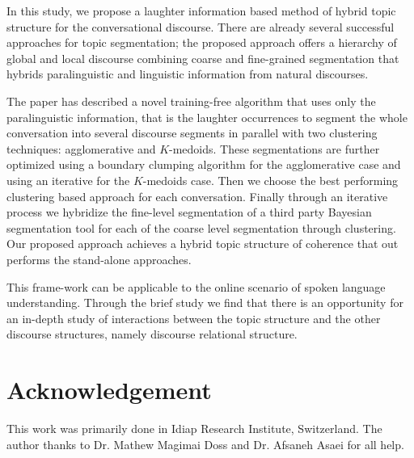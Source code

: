 \documentclass{article}
\begin{document}
In this study, we propose a laughter information based method of hybrid topic structure for the conversational discourse. There are already several successful approaches for topic segmentation; the proposed approach offers a hierarchy of global and local discourse combining coarse and fine-grained segmentation that hybrids paralinguistic and linguistic information from natural discourses. 

The paper has described a novel training-free algorithm that uses only the paralinguistic information, that is the laughter occurrences to segment the whole conversation into several discourse segments in parallel with two clustering techniques: agglomerative and $K$-medoids. These segmentations are further optimized using a boundary clumping algorithm for the agglomerative case and using an iterative for the $K$-medoids case. Then we choose the best performing clustering based approach for each conversation. Finally through an iterative process we hybridize the fine-level segmentation of a third party Bayesian segmentation tool for each of the coarse level segmentation through clustering. Our proposed approach achieves a hybrid topic structure of coherence that out performs the stand-alone approaches. %

This frame-work can be applicable to the online scenario of spoken language understanding. %
Through the brief study we find that there is an opportunity for an in-depth study of interactions between the topic structure and the other discourse structures, namely discourse relational structure.
\section{Acknowledgement}
This work was primarily done in Idiap Research Institute, Switzerland. The author thanks to Dr. Mathew Magimai Doss and Dr. Afsaneh Asaei for all help.



\end{document}
